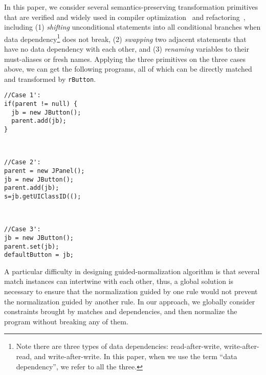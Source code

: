 \documentclass[a4paper, USenglish]{lipics-v2016}
\newenvironment{smpage}[1]
{\begin{lrbox}{\fmbox}\begin{minipage}{#1}}
{\end{minipage}\end{lrbox}\usebox{\fmbox}}
\newcommand{\code}[1]{\texttt{\footnotesize #1}}
\theoremstyle{plain}
\begin{document}
In this paper, we consider several semantics-preserving transformation primitives that are verified and widely used in compiler optimization~\cite{Wegman:1991:CPC:103135.103136,Aho:2006:CPT:1177220,Callahan:1986:ICP:12276.13327,DBLP:conf/sefm/KanadeSK06} and  refactoring~\cite{Schafer:2008:SER:1449764.1449787,Opdyke:1992:ROF:169783,Roberts:1999:PAR:929806}, including (1) \emph{shifting} unconditional statements into
all conditional branches when data dependency\footnote{Note there are three types of data dependencies:
  read-after-write, write-after-read, and write-after-write. In this
  paper, when we use the term ``data dependency'', we refer to all the three.} does not break, (2)
\emph{swapping} two adjacent statements that have no data
dependency
with each other, and (3) \emph{renaming} variables to their
must-aliases or fresh names.  Applying the three primitives
on the three cases above, we can get the following
programs, all of which can be directly matched and transformed by \code{rButton}.
\begin{center}
\begin{smpage}{0.3\columnwidth}
\begin{lstlisting}[style=patl,frame=none,numbers=none, basicstyle=\scriptsize\ttfamily]
//Case 1':
if(parent != null) {
  jb = new JButton();
  parent.add(jb);
}
\end{lstlisting}
\end{smpage}
~~
\begin{smpage}{0.3\columnwidth}
\begin{lstlisting}[style=patl,frame=none,numbers=none, basicstyle=\scriptsize\ttfamily]
//Case 2':
parent = new JPanel();
jb = new JButton();
parent.add(jb);
s=jb.getUIClassID(();
\end{lstlisting}
\end{smpage}
~~
\begin{smpage}{0.3\columnwidth}
\begin{lstlisting}[style=patl,frame=none,numbers=none, basicstyle=\scriptsize\ttfamily]
//Case 3':
jb = new JButton();
parent.set(jb);
defaultButton = jb;
\end{lstlisting}
\end{smpage}
\end{center}

A particular difficulty in designing guided-normalization algorithm is that several match
instances can intertwine with each other, thus, a global solution is necessary to ensure that the normalization guided by one rule would not prevent the normalization guided by another rule. In our approach, we globally consider constraints brought by matches and dependencies, and then normalize the program without breaking any of them.
\end{document}
